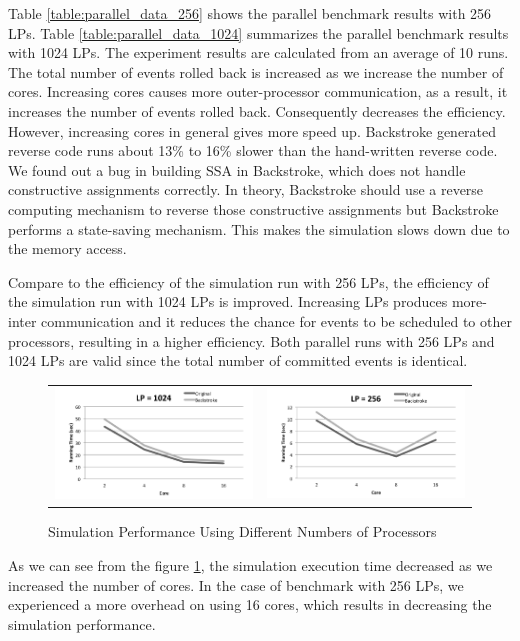Table \ref{table:parallel_data_256} shows the parallel benchmark results with 256 LPs.
Table \ref{table:parallel_data_1024} summarizes the parallel benchmark results with 1024 LPs.
The experiment results are calculated from an average of 10 runs. 
The total number of events rolled back is increased as we increase the number of cores.
Increasing cores causes more outer-processor communication, as a  result, it increases the number of events rolled back.
Consequently decreases the efficiency. However, increasing cores in general gives more speed up.
Backstroke generated reverse code runs about 13\% to 16\% slower than the hand-written reverse code.
We found out a bug in building SSA in Backstroke, which does not handle constructive assignments correctly.
In theory, Backstroke should use a reverse computing mechanism to reverse those constructive assignments but Backstroke performs a state-saving mechanism.
This makes the simulation slows down due to the memory access. 

Compare to the efficiency of the simulation run with 256 LPs, the efficiency of the simulation run with 1024 LPs is improved.
Increasing LPs produces more-inter communication and it reduces the chance for events to be scheduled to other processors,
resulting in a higher efficiency. Both parallel runs with 256 LPs and 1024 LPs are valid since the total number of committed events is identical. 

\begin{figure}
\centering
\begin{tabular}{cc}
\begin{minipage}{200pt}
\includegraphics[width=3.0in]{figs/p_runtime_1024.png}
\end{minipage}
&
\begin{minipage}{200pt}
\includegraphics[width=3.0in]{figs/p_runtime_256.png}

\end{minipage}
\end{tabular}
\caption{Simulation Performance Using Different Numbers of Processors}
\label{fig:p_runtime}
\end{figure}



As we can see from the figure \ref{fig:p_runtime}, the simulation execution time decreased as we increased the number of cores.
In the case of benchmark with 256 LPs, we experienced a more overhead on using 16 cores, which results in decreasing the simulation performance. 